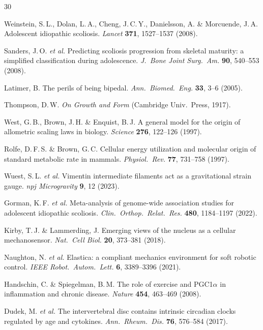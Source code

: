 \documentclass[12pt]{article}
\begin{document}
\begin{thebibliography}{30}

Weinstein, S.\,L., Dolan, L.\,A., Cheng, J.\,C.\,Y., Danielsson, A. \& Morcuende, J.\,A. Adolescent idiopathic scoliosis. \textit{Lancet} \textbf{371}, 1527--1537 (2008).

Sanders, J.\,O. \textit{et al.} Predicting scoliosis progression from skeletal maturity: a simplified classification during adolescence. \textit{J.\ Bone Joint Surg.\ Am.} \textbf{90}, 540--553 (2008).

Latimer, B. The perils of being bipedal. \textit{Ann.\ Biomed.\ Eng.} \textbf{33}, 3--6 (2005).

Thompson, D.\,W. \textit{On Growth and Form} (Cambridge Univ.\ Press, 1917).

West, G.\,B., Brown, J.\,H. \& Enquist, B.\,J. A general model for the origin of allometric scaling laws in biology. \textit{Science} \textbf{276}, 122--126 (1997).

Rolfe, D.\,F.\,S. \& Brown, G.\,C. Cellular energy utilization and molecular origin of standard metabolic rate in mammals. \textit{Physiol.\ Rev.} \textbf{77}, 731--758 (1997).

Wuest, S.\,L. \textit{et al.} Vimentin intermediate filaments act as a gravitational strain gauge. \textit{npj Microgravity} \textbf{9}, 12 (2023).

Gorman, K.\,F. \textit{et al.} Meta-analysis of genome-wide association studies for adolescent idiopathic scoliosis. \textit{Clin.\ Orthop.\ Relat.\ Res.} \textbf{480}, 1184--1197 (2022).

Kirby, T.\,J. \& Lammerding, J. Emerging views of the nucleus as a cellular mechanosensor. \textit{Nat.\ Cell Biol.} \textbf{20}, 373--381 (2018).

Naughton, N. \textit{et al.} Elastica: a compliant mechanics environment for soft robotic control. \textit{IEEE Robot.\ Autom.\ Lett.} \textbf{6}, 3389--3396 (2021).

Handschin, C. \& Spiegelman, B.\,M. The role of exercise and PGC1$\alpha$ in inflammation and chronic disease. \textit{Nature} \textbf{454}, 463--469 (2008).

Dudek, M. \textit{et al.} The intervertebral disc contains intrinsic circadian clocks regulated by age and cytokines. \textit{Ann.\ Rheum.\ Dis.} \textbf{76}, 576--584 (2017).


\end{thebibliography}
\end{document}
